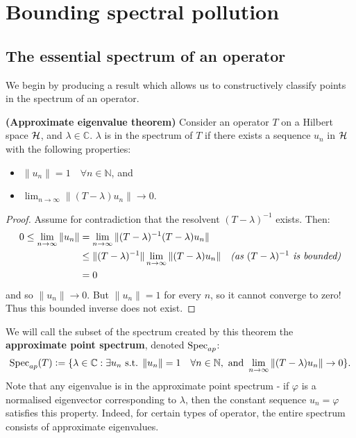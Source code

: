 \documentclass[../main.tex]{subfiles}
\begin{document}
\section{Bounding spectral pollution}\label{chapter:bounds}

\subsection{The essential spectrum of an operator}\label{sec:ess-spec}

We begin by producing a result which allows us to constructively classify points
in the spectrum of an operator.
\begin{theorem}{\textbf{(Approximate eigenvalue theorem)}}
\label{thm:approx-eigenvalue-thm}
  Consider an operator $T$ on a Hilbert space $\mathcal{H}$, and $\lambda \in
  \mathbb{C}$. $\lambda$ is in the spectrum of $T$ if there exists a
  sequence $u_n$ in $\mathcal{H}$ with the following properties:
  \begin{itemize}
  \item $\|u_n\| = 1\quad \forall n \in \mathbb{N}$, and
  \item $\lim_{n \rightarrow \infty}\|(T - \lambda)u_n\|  \rightarrow 0$.
  \end{itemize}
\end{theorem}
\begin{proof}
Assume for contradiction that the resolvent $(T - \lambda)^{-1}$ exists. Then:
\begin{align*}
0 \leq \lim_{n \rightarrow \infty} \|u_n\| & 
	= \lim_{n \rightarrow \infty} \|(T - \lambda)^{-1}(T - \lambda)u_n\| & \\
& \leq \|(T - \lambda)^{-1}\| \lim_{n \rightarrow \infty} \|(T - \lambda)u_n\| & 
	\text{\emph{(as $(T - \lambda)^{-1}$ is bounded)}}\\
& = 0
\end{align*}
and so $\|u_n\| \rightarrow 0$. But $\|u_n\| = 1$ for every $n$, so it cannot
converge to zero! Thus this bounded inverse does not exist.
\end{proof}
We will call the subset of the spectrum created by this theorem the
\textbf{approximate point spectrum}, denoted
$\mathrm{Spec}_{ap}$:
$$\mathrm{Spec}_{ap}(T) \mathrel{\mathop:}= \{ \lambda \in \mathbb{C} : \exists u_n \text{ s.t. } \|u_n\| = 1\quad \forall n \in \mathbb{N},\text{ and }\lim_{n \rightarrow \infty}\|(T - \lambda)u_n\|  \rightarrow 0\}.$$
Note that any eigenvalue is in the approximate point spectrum - if $\varphi$ is
a normalised eigenvector corresponding to $\lambda$, then the constant sequence
$u_n = \varphi$ satisfies this property. Indeed, for certain types of operator,
the entire spectrum consists of approximate eigenvalues.
\end{document}

